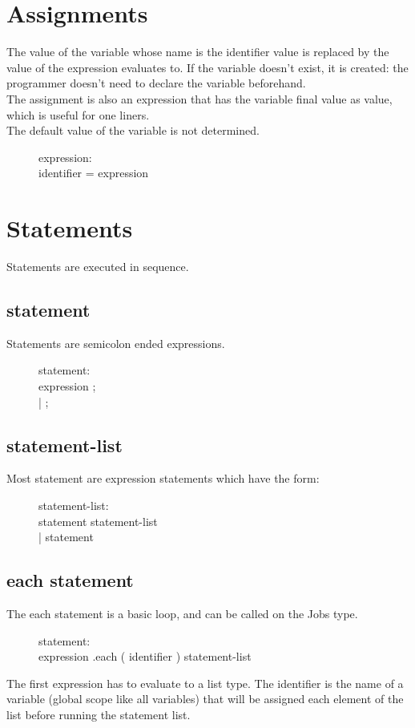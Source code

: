 \section{Assignments}
The value of the variable whose name is the identifier value is replaced by the value of the expression
evaluates to. If the variable doesn't exist, it is created: the programmer doesn't need to declare the
variable beforehand.\\
The assignment is also an expression that has the variable final value as value, which is useful for
one liners.\\
The default value of the variable is not determined.
\begin{description}
  \item[]expression: \hfill \\
    identifier = expression
\end{description}

\section{Statements}
Statements are executed in sequence.

\subsection{statement}
Statements are semicolon ended expressions.
\begin{description}
  \item[]statement: \hfill \\
    expression ; \\
    | ;
\end{description}

\subsection{statement-list}
Most statement are expression statements which have the form:
\begin{description}
  \item[]statement-list: \hfill \\
    statement statement-list \\
    | statement
\end{description}

\subsection{each statement}
The each statement is a basic loop, and can be called on the Jobs type.
\begin{description}
  \item[]statement: \hfill \\
    expression .each ( identifier ) { statement-list }
\end{description}
The first expression has to evaluate to a list type. The identifier is the name
of a variable (global scope like all variables) that will be assigned each
element of the list before running the statement list.


